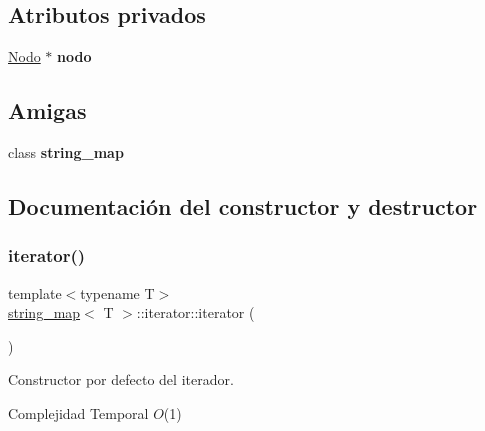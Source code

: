 \subsection*{Atributos privados}
\begin{DoxyCompactItemize}
\item 
\mbox{\label{classstring__map_1_1iterator_ac153c60abe33692e040a47f7f7457db8}} 
\mbox{\hyperlink{structstring__map_1_1Nodo}{Nodo}} $\ast$ {\bfseries nodo}
\end{DoxyCompactItemize}
\subsection*{Amigas}
\begin{DoxyCompactItemize}
\item 
\mbox{\label{classstring__map_1_1iterator_a70a1267e13829b1e5be02846caf0ee84}} 
class {\bfseries string\+\_\+map}
\end{DoxyCompactItemize}


\subsection{Documentación del constructor y destructor}
\mbox{\label{classstring__map_1_1iterator_adfa11e83ddfb983172d2fb367184c486}} 
\subsubsection{\texorpdfstring{iterator()}{iterator()}\hspace{0.1cm}{\footnotesize\ttfamily [1/2]}}
{\footnotesize\ttfamily template$<$typename T$>$ \\
\mbox{\hyperlink{classstring__map}{string\+\_\+map}}$<$ T $>$\+::iterator\+::iterator (\begin{DoxyParamCaption}{ }\end{DoxyParamCaption})\hspace{0.3cm}{\ttfamily [inline]}}



Constructor por defecto del iterador. 


\begin{DoxyDescription}
\item[Complejidad Temporal]$O$(1)
\end{DoxyDescription}\mbox{\label{classstring__map_1_1iterator_a9421aa5f1c72795f03172f3e0ecd87ca}} 

